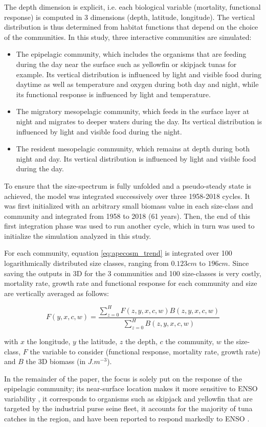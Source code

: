 The depth dimension is explicit, i.e. each biological variable (mortality, functional response) is computed in 3 dimensions (depth, latitude, longitude). The vertical distribution is thus determined from habitat functions that depend on the choice of the communities. In this study, three interactive communities are simulated:
\begin{itemize}
\item{The epipelagic community, which includes the organisms that are feeding during the day near the surface such as yellowfin or skipjack tunas for example. Its vertical distribution is influenced by light and visible food during daytime as well as temperature and oxygen during both day and night, while its functional response is influenced by light and temperature.}
\item{The migratory mesopelagic community, which feeds in the surface layer at night and migrates to deeper waters during the day. Its vertical distribution is influenced by light and visible food during the night.}
\item{The resident mesopelagic community, which remains at depth during both night and day. Its vertical distribution is influenced by light and visible food during the day.}
\end{itemize}

To ensure that the size-spectrum is fully unfolded and a pseudo-steady state is achieved, the model was integrated successively over three 1958-2018 cycles. It was first initialized with an arbitrary small biomass value in each size-class and community and integrated from 1958 to 2018 (61 years). Then, the end of this first integration phase was used to run another cycle, which in turn was used to initialize the simulation analyzed in this study.

For each community, equation \ref{eq:apecosm_trend} is integrated over 100 logarithmically distributed size classes, ranging from $0.123cm$ to $196cm$. Since saving the outputs in 3D for the 3 communities and 100 size-classes is very costly, mortality rate, growth rate and functional response for each community and size are vertically averaged as follows:

\begin{equation}
F(y,x,c,w) = \frac{\sum_{z=0}^{H} F(z, y, x, c, w) B(z, y, x, c, w)}{\sum_{z=0}^{H}B(z, y, x, c, w	)}
\end{equation}

with $x$ the longitude, $y$ the latitude, $z$ the depth, $c$ the community, $w$ the size-class, $F$ the variable to consider (functional response, mortality rate, growth rate) and $B$ the 3D biomass (in $J.m^{-3}$).

In the remainder of the paper, the focus is solely put on the response of the epipelagic community; its near-surface location makes it more sensitive to ENSO variability \citep{lemezoNaturalVariabilityMarine2016}, it corresponds to organisms such as skipjack and yellowfin that are targeted by the industrial purse seine fleet, it accounts for the majority of tuna catches in the region, and have been reported to respond markedly to ENSO \citep{lehodeyNinoSouthernOscillation1997}.
